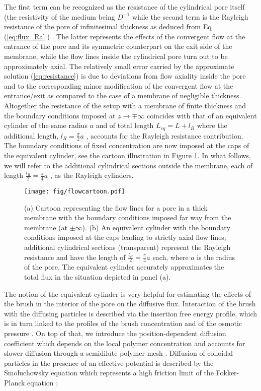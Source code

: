 The first term can be recognized as the resistance of the cylindrical pore itself (the resistivity of the medium being $D^{-1}$ while the second term is the Rayleigh resistance of the pore of infinitesimal thickness as deduced from Eq  (\ref{eq:flux_Ral}) . The latter represents the effects of the convergent flow at the entrance of the pore and its symmetric counterpart on the exit side of the membrane, while the flow lines inside the cylindrical pore turn out to be approximately axial. The relatively small error carried by the approximate solution  (\ref{eq:resistance})  is due to deviations from flow axiality inside the pore and to the corresponding minor modification of the convergent flow at the entrance/exit as compared to the case of a membrane of negligible thickness.. 
Altogether the resistance of the setup with a membrane of finite thickness and the boundary conditions imposed at $z\rightarrow\mp\infty$ coincides with that of an equivalent cylinder of the same radius $a$ and of total length $L_{eq}=L+l_{R}$   where the additional length,  $l_{R}=\frac{\pi}{2}a$ , accounts for the Rayleigh resistance contribution. The boundary conditions of fixed concentration are now imposed at the caps of the equivalent cylinder, see the cartoon illustration in Figure \ref{fig:flow_cartoon}. In what follows, we will refer to the additional cylindrical sections outside the membrane, each of length $\frac{l_{R}}{2}=\frac{\pi}{4}a$ , as the Rayleigh cylinders.
 
 
\begin{figure}
    \centering
    \texttt{[image: fig/flowcartoon.pdf]}
    \caption{ (a) Cartoon representing the flow lines for a pore in a thick membrane with the boundary conditions imposed far way from the membrane (at $\pm\infty$). (b) An equivalent cylinder with the boundary conditions imposed at the caps leading to strictly axial flow lines; additional cylindrical sections (transparent) represent the Rayleigh resistance and have the length of  $\frac{l_{R}}{2}=\frac{\pi}{4}a$  each, where $a$ is the radius of the pore. The equivalent cylinder accurately approximates the total flux in the situation depicted in panel (a).}
    \label{fig:flow_cartoon}
\end{figure}


The notion of the equivalent cylinder is very helpful for estimating the effects of the brush in the interior of the pore on the diffusive flux. Interaction of the brush with the diffusing particles is described via the insertion free energy profile, which is in turn linked to the profiles of the brush concentration and of the osmotic pressure \cite{Laktionov2023}. On top of that, we introduce the position-dependent diffusion coefficient which depends on the local polymer concentration and accounts for slower diffusion through a semidilute polymer mesh \cite{Laktionov2023}.
Diffusion of colloidal particles in the presence of an effective potential is described by the Smoluchowsky equation which represents a high friction limit of the Fokker-Planck equation \cite{Risken1996}:

